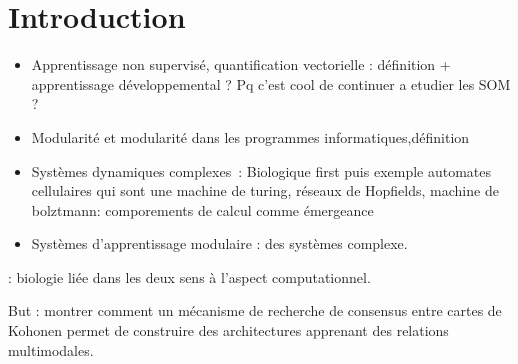 \section*{Introduction}

\begin{itemize}
    \item Apprentissage non supervisé, quantification vectorielle : définition + apprentissage développemental ? Pq c'est cool de continuer a etudier les SOM ?
    \item Modularité et modularité dans les programmes informatiques,définition
    \item Systèmes dynamiques complexes~: Biologique first puis exemple automates cellulaires qui sont une machine de turing, réseaux de Hopfields, machine de bolztmann: comporements de calcul comme émergeance
    \item Systèmes d'apprentissage modulaire : des systèmes complexe.
\end{itemize}

\cite{Oudeyer2010OnTI} : biologie liée dans les deux sens à l'aspect computationnel.


But : montrer comment un mécanisme de recherche de consensus entre cartes de Kohonen permet de construire des architectures apprenant des relations multimodales.